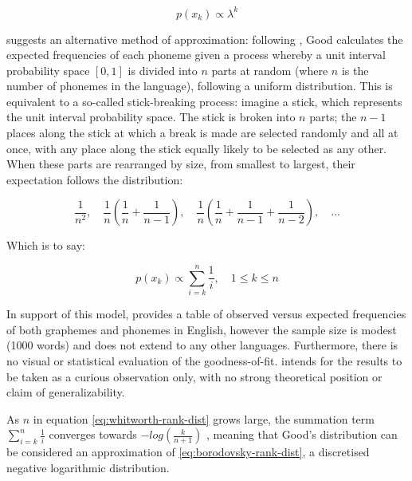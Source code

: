 \begin{equation}
p(x_k) \propto \lambda^k
\label{eq:sigurds-geometric}
\end{equation}

\textcite[p.577]{good_statistics_1969} suggests an alternative method of approximation: following \textcite{whitworth_choice_1901}, Good calculates the expected frequencies of each phoneme given a process whereby a unit interval probability space \([0,1]\) is divided into \(n\) parts at random (where \(n\) is the number of phonemes in the language), following a uniform distribution. This is equivalent to a so-called stick-breaking process: imagine a stick, which represents the unit interval probability space. The stick is broken into \(n\) parts; the \(n-1\) places along the stick at which a break is made are selected randomly and all at once, with any place along the stick equally likely to be selected as any other. When these parts are rearranged by size, from smallest to largest, their expectation follows the distribution:

\begin{equation}
\frac{1}{n^2},\quad \frac{1}{n} \left( \frac{1}{n} + \frac{1}{n-1} \right),\quad \frac{1}{n} \left( \frac{1}{n} + \frac{1}{n-1} + \frac{1}{n-2} \right),\quad ...
\label{eq:whitworth-dist}
\end{equation}

Which is to say:

\begin{equation}
p(x_k) \propto \sum_{i=k}^{n} \frac{1}{i}, \quad 1 \leq k \leq n
\label{eq:whitworth-rank-dist}
\end{equation}

In support of this model, \textcite[p.577]{good_statistics_1969} provides a table of observed versus expected frequencies of both graphemes and phonemes in English, however the sample size is modest (1000 words) and does not extend to any other languages. Furthermore, there is no visual or statistical evaluation of the goodness-of-fit. \textcite{good_statistics_1969} intends for the results to be taken as a curious observation only, with no strong theoretical position or claim of generalizability.

As \(n\) in equation \eqref{eq:whitworth-rank-dist} grows large, the summation term \(\sum_{i=k}^{n} \frac{1}{i}\) converges towards \(-log(\frac{k}{n+1})\) \autocite[p.~12]{loeb1989formal}, meaning that Good's distribution can be considered an approximation of \eqref{eq:borodovsky-rank-dist}, a discretised negative logarithmic distribution.


